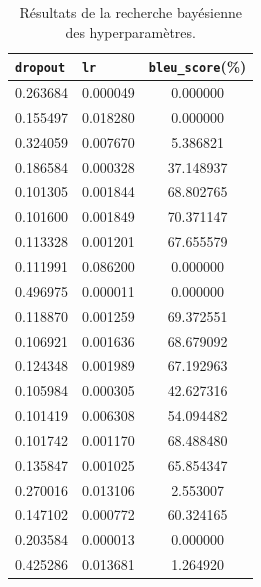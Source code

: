 \begin{table}[htb]
    \begin{center}
        \begin{tabular}{llc}
            \toprule
            \verb|dropout| & \verb|lr| & \verb|bleu_score|(\%) \\
            \midrule
            0.263684       & 0.000049 &        0.000000        \\
            0.155497       & 0.018280 &        0.000000        \\
            0.324059       & 0.007670 &        5.386821        \\
            0.186584       & 0.000328 &       37.148937        \\
            0.101305       & 0.001844 &       68.802765        \\
            0.101600       & 0.001849 &       70.371147        \\
            0.113328       & 0.001201 &       67.655579        \\
            0.111991       & 0.086200 &        0.000000        \\
            0.496975       & 0.000011 &        0.000000        \\
            0.118870       & 0.001259 &       69.372551        \\
            0.106921       & 0.001636 &       68.679092        \\
            0.124348       & 0.001989 &       67.192963        \\
            0.105984       & 0.000305 &       42.627316        \\
            0.101419       & 0.006308 &       54.094482        \\
            0.101742       & 0.001170 &       68.488480        \\
            0.135847       & 0.001025 &       65.854347        \\
            0.270016       & 0.013106 &        2.553007        \\
            0.147102       & 0.000772 &       60.324165        \\
            0.203584       & 0.000013 &        0.000000        \\
            0.425286       & 0.013681 &        1.264920        \\
            \bottomrule
        \end{tabular}
    
    \end{center}
    \caption{Résultats de la recherche bayésienne des hyperparamètres.}%
    \label{tab.results.hparams}
\end{table}

